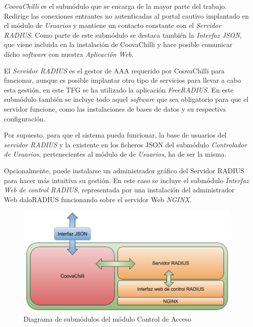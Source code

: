 \emph{CoovaChilli} es el submódulo que se encarga de la mayor parte del trabajo. Redirige las conexiones entrantes no autenticadas al portal cautivo implantado en el módulo de \emph{Usuarios} y mantiene un contacto constante con el \emph{Servidor RADIUS}. Como parte de este submódulo se destaca también la \emph{Interfaz JSON}, que viene incluida en la instalación de CoovaChilli y hace posible comunicar dicho \emph{software} con nuestra \emph{Aplicación Web}.

El \emph{Servidor RADIUS} es el gestor de AAA requerido por CoovaChilli para funcionar, aunque es posible implantar otro tipo de servicios para llevar a cabo esta gestión, en este TFG se ha utilizado la aplicación \emph{FreeRADIUS}. En este submódulo también se incluye todo aquel \emph{software} que sea obligatorio para que el servidor funcione, como las instalaciones de bases de datos y su respectiva configuración.

Por supuesto, para que el sistema pueda funcionar, la base de usuarios del \emph{servidor RADIUS} y la existente en los ficheros JSON del submódulo \emph{Controlador de Usuarios}, pertenecientes al módulo de de \emph{Usuarios}, ha de ser la misma.

Opcionalmente, puede instalarse un administrador gráfico del Servidor RADIUS para hacer más intuitiva su gestión. En este caso se incluye el submódulo \emph{Interfaz Web de control RADIUS}, representada por una instalación del administrador Web daloRADIUS funcionando sobre el servidor Web \emph{NGINX}.

\begin{figure}[!t]
\begin{center}
\includegraphics[width=0.75\linewidth]{./4_AnalisisFuncional/Img/moduloControlAcceso.png}
\end{center}
\caption{Diagrama de submódulos del módulo Control de Acceso}
\label{moduloControlAcceso}
\end{figure}

